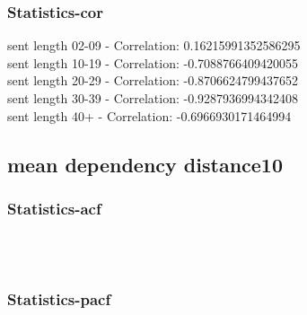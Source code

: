 \documentclass{article}%
\begin{document}
%
\newpage%
\subsubsection{Statistics{-}cor}%
\label{ssubsec:Statistics{-}cor}%
\noindent%
sent length 02-09 - Correlation: 0.16215991352586295\\%
sent length 10-19 - Correlation: -0.7088766409420055\\%
sent length 20-29 - Correlation: -0.8706624799437652\\%
sent length 30-39 - Correlation: -0.9287936994342408\\%
sent length 40+ - Correlation: -0.6966930171464994\\

%
\newpage

%
\subsection{mean dependency distance10}%
\label{subsec:meandependencydistance10}%
\subsubsection{Statistics{-}acf}%
\label{ssubsec:Statistics{-}acf}%


\begin{figure}[ht]%
\centering%
\setlength{\abovecaptionskip}{-35pt}%
%
%
\\%
%
%
\\%
%
\end{figure}

%
\newpage%
\subsubsection{Statistics{-}pacf}%
\label{ssubsec:Statistics{-}pacf}%
\end{document}

